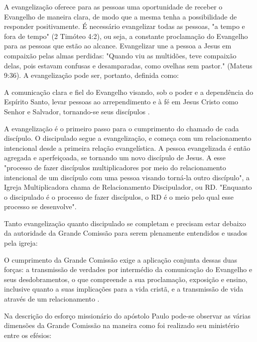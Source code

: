 \documentclass[12pt,openright,oneside,a4paper]{abntex2}
\begin{document}
A evangelização oferece para as pessoas uma oportunidade de receber o Evangelho de maneira clara, de modo que a mesma tenha a possibilidade de responder positivamente. É necessário evangelizar todas as pessoas, "a tempo e fora de tempo" (2 Timóteo 4:2), ou seja, a constante proclamação do Evangelho para as pessoas que estão ao alcance. Evangelizar une a pessoa a Jesus em compaixão pelas almas perdidas: "Quando viu as multidões, teve compaixão delas, pois estavam confusas e desamparadas, como ovelhas sem pastor." (Mateus 9:36). A evangelização pode ser, portanto, definida como: 

\begin{citacao}A comunicação clara e fiel do Evangelho visando, sob o poder e a dependência do Espírito Santo, levar pessoas ao arrependimento e à fé em Jesus Cristo como Senhor e Salvador, tornando-se seus discípulos \cite[p. 57]{brandao}.\end{citacao}

A evangelização é o primeiro passo para o cumprimento do chamado de cada discípulo. O discipulado segue a evangelização, e começa com um relacionamento intencional desde a primeira relação evangelística. A pessoa evangelizada é então agregada e aperfeiçoada, se tornando um novo discípulo de Jesus. A esse "processo de fazer discípulos multiplicadores por meio do relacionamento intencional de um discípulo com uma pessoa visando torná-la outro discípulo"\cite[p. 64]{brandao}, a Igreja Multiplicadora chama de Relacionamento Discipulador, ou RD. "Enquanto o discipulado é o processo de fazer discípulos, o RD é o meio pelo qual esse processo se desenvolve"\cite[p. 64]{brandao}.

Tanto evangelização quanto discipulado se completam e precisam estar debaixo da autoridade da Grande Comissão para serem plenamente entendidos e usados pela igreja:

\begin{citacao}O cumprimento da Grande Comissão exige a aplicação conjunta dessas duas forças: a transmissão de verdades por intermédio da comunicação do Evangelho e seus desdobramentos, o que compreende a sua proclamação, exposição e ensino, inclusive quanto a suas implicações para a vida cristã, e a transmissão de	vida através de um relacionamento \cite[p. 66]{brandao}.\end{citacao} 

Na descrição do esforço missionário do apóstolo Paulo pode-se observar as várias dimensões da Grande Comissão na maneira como foi realizado seu ministério entre os efésios:
\end{document}
